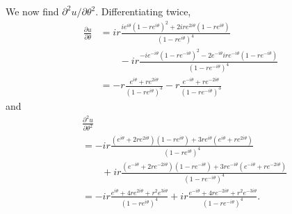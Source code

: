 \documentclass[paperoneside]{article}
\begin{document}
\begin{enumerate}[label=(\roman*)]
    We now find $\partial^2 u/\partial \theta^2$. Differentiating twice,
    \begin{align*}
      \frac{\partial u}{\partial\theta}
      &= ir\frac{ie^{i\theta}(1-re^{i\theta})^2 + 2ire^{2i\theta}(1-re^{i\theta})}{(1-re^{i\theta})^4} \\
      &\qquad- ir\frac{-ie^{-i\theta}(1-re^{-i\theta})^2 - 2e^{-i\theta}ire^{-i\theta}(1-re^{-i\theta})}{(1-re^{-i\theta})^4} \\
      &= -r\frac{e^{i\theta} + re^{2i\theta}}{(1-re^{i\theta})^3}
      - r\frac{e^{-i\theta} + re^{-2i\theta}}{(1-re^{-i\theta})^3}
    \end{align*}
    and
    \begin{align*}
      &\frac{\partial^2 u}{\partial\theta^2} \\
      &= -ir\frac{(e^{i\theta} + 2re^{2i\theta})(1-re^{i\theta}) + 3re^{i\theta}(e^{i\theta} + re^{2i\theta})}{(1-re^{i\theta})^4} \\
      &\qquad + ir\frac{(e^{-i\theta} + 2re^{-2i\theta})(1-re^{-i\theta}) + 3re^{-i\theta}(e^{-i\theta} + re^{-2i\theta})}{(1-re^{-i\theta})^4} \\
      &= -ir\frac{e^{i\theta} + 4re^{2i\theta} + r^2e^{3i\theta}}{(1-re^{i\theta})^4} + ir\frac{e^{-i\theta} + 4re^{-2i\theta} + r^2e^{-3i\theta}}{(1-re^{-i\theta})^4} \text{.}
    \end{align*}


\end{enumerate}
\end{document}
